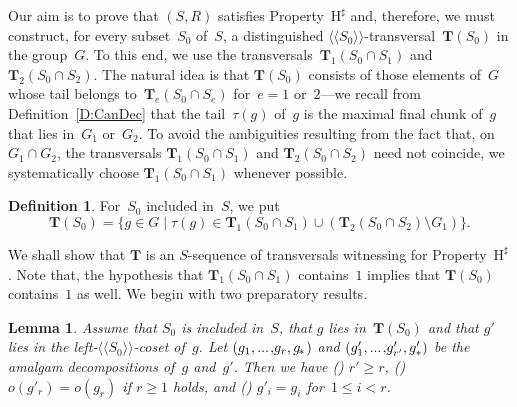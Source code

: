\documentclass{amsart}
\numberwithin{equation}{section}
\theoremstyle{plain}
\newtheorem{lemm}[prop]{Lemma}
\theoremstyle{definition}
\newtheorem{defi}[prop]{Definition}
\let\ge=\geqslant
\newcounter{ITEM}
\let\le=\leqslant
\begin{document}
Our aim is to prove that $({S}, {R})$ satisfies Property~${{\mathrm{H}}^\sharp}$ and, therefore, we must construct, for every subset~${S}_0$ of~${S}$, a distinguished ${\langle\!\langle{{{S}_0}}\rangle\!\rangle}$-transversal~${\boldsymbol{T}}({S}_0)$ in the group~${G}$. To this end, we use the transversals~${\boldsymbol{T}}_1({S}_0 \cap {S}_1)$ and~${\boldsymbol{T}}_2({S}_0 \cap {S}_2)$. The natural idea is that ${\boldsymbol{T}}({S}_0)$ consists of those elements of~${G}$ whose tail belongs to~${\boldsymbol{T}}_{e}({S}_0 \cap {S}_{e})$ for~${e} = 1$ or~$2$---we recall from Definition~\ref{D:CanDec} that the tail~${\tau({g})}$ of~${g}$ is the maximal final chunk of~${g}$ that lies in~${G}_1$ or~${G}_2$. To avoid the ambiguities resulting from the fact that, on~${G}_1 \cap {G}_2$, the transversals ${\boldsymbol{T}}_1({S}_0 \cap {S}_1)$ and ${\boldsymbol{T}}_2({S}_0 \cap {S}_2)$ need not coincide, we systematically choose ${\boldsymbol{T}}_1({S}_0 \cap {S}_1)$ whenever possible. 

\begin{defi}
For~${S}_0$ included in~${S}$, we put 
\begin{equation}
{\boldsymbol{T}}({S}_0) = \{ {g} \in {G} \mid {\tau({g})} \in {\boldsymbol{T}}_1({S}_0 \cap {S}_1) \cup ({\boldsymbol{T}}_2({S}_0 \cap {S}_2) \setminus {G}_1) \}.
\end{equation}
\end{defi}

We shall show that ${\boldsymbol{T}}$ is an ${S}$-sequence of transversals witnessing for Property~${{\mathrm{H}}^\sharp}$. Note that, the hypothesis that ${\boldsymbol{T}}_1({S}_0 \cap {S}_1)$ contains~$1$ implies that ${\boldsymbol{T}}({S}_0)$ contains~$1$ as well. We begin with two preparatory results.

\begin{lemm}
\label{L:Length}
Assume that ${S}_0$ is included in~${S}$, that ${g}$ lies in~${\boldsymbol{T}}({S}_0)$ and that ${g}'$ lies in the left-${\langle\!\langle{{{S}_0}}\rangle\!\rangle}$-coset of~${g}$. Let $({g}_1 {, ...\hspace{0.2ex},} {g}_{r}, {{g}_{\hspace{-0.2ex}*\hspace{0.2ex}}})$ and $({g}'_1 {, ...\hspace{0.2ex},} {g}'_{{r}'}, {g}'_*)$ be the amalgam decompositions of~${g}$ and~${g}'$. Then we have {\setcounter{ITEM}{1}\leavevmode\hbox{\rm()}} ${r}' \ge {r}$, {\setcounter{ITEM}{2}\leavevmode\hbox{\rm()}} ${o({{g}'_{r}})} = {o({{g}_{r}})}$ if ${r} \ge 1$ holds, and {\setcounter{ITEM}{3}\leavevmode\hbox{\rm()}} ${g}'_{i} = {g}_{i}$ for~$1 \le {i} < {r}$.
\end{lemm} 
\end{document}
